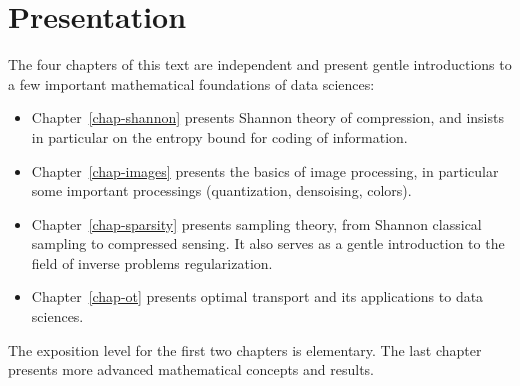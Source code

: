 
\chapter*{Presentation}


The four chapters of this text are independent and present gentle introductions to a few important mathematical foundations of data sciences:
\begin{itemize}
	\item Chapter~\ref{chap-shannon} presents Shannon theory of compression, and insists in particular on the entropy bound for coding of information.
	\item Chapter~\ref{chap-images} presents the basics of image processing, in particular some important processings (quantization, densoising, colors).
	\item Chapter~\ref{chap-sparsity} presents sampling theory, from Shannon classical sampling to compressed sensing. It also serves as a gentle introduction to the field of inverse problems regularization.
	\item Chapter~\ref{chap-ot} presents optimal transport and its applications to data sciences.
\end{itemize}
The exposition level for the first two chapters is elementary. The last chapter presents more advanced mathematical concepts and results. 


\tableofcontents